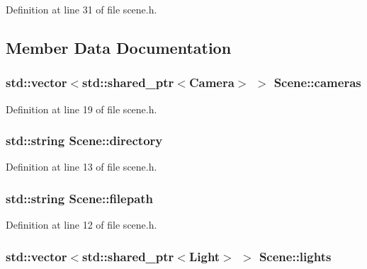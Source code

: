 Definition at line 31 of file scene.\+h.



\subsection{Member Data Documentation}
\hypertarget{class_scene_a93e268bf22b01395c867544ba94d2581}{}
\subsubsection[{cameras}]{\setlength{\rightskip}{0pt plus 5cm}std\+::vector$<$std\+::shared\+\_\+ptr$<${\bf Camera}$>$ $>$ Scene\+::cameras}\label{class_scene_a93e268bf22b01395c867544ba94d2581}


Definition at line 19 of file scene.\+h.

\hypertarget{class_scene_ae729793e28fa5451457cb869ee40bed5}{}
\subsubsection[{directory}]{\setlength{\rightskip}{0pt plus 5cm}std\+::string Scene\+::directory\hspace{0.3cm}{\ttfamily [protected]}}\label{class_scene_ae729793e28fa5451457cb869ee40bed5}


Definition at line 13 of file scene.\+h.

\hypertarget{class_scene_a91db1772797d8efa8ef62bf8930f057e}{}
\subsubsection[{filepath}]{\setlength{\rightskip}{0pt plus 5cm}std\+::string Scene\+::filepath\hspace{0.3cm}{\ttfamily [protected]}}\label{class_scene_a91db1772797d8efa8ef62bf8930f057e}


Definition at line 12 of file scene.\+h.

\hypertarget{class_scene_acc070003e3f35147692a64229ef2c9d3}{}
\subsubsection[{lights}]{\setlength{\rightskip}{0pt plus 5cm}std\+::vector$<$std\+::shared\+\_\+ptr$<${\bf Light}$>$ $>$ Scene\+::lights}\label{class_scene_acc070003e3f35147692a64229ef2c9d3}


